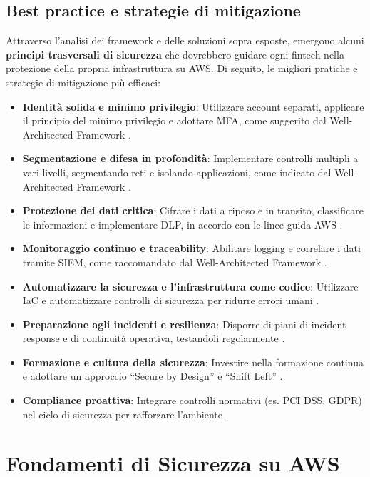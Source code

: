 \documentclass[a4paper,12pt]{report}
\begin{document}
\section{Best practice e strategie di mitigazione}
\label{sec:best_practices}
Attraverso l’analisi dei framework e delle soluzioni sopra esposte, emergono alcuni \textbf{principi trasversali di sicurezza} che dovrebbero guidare ogni fintech nella protezione della propria infrastruttura su AWS. Di seguito, le migliori pratiche e strategie di mitigazione più efficaci:
\begin{itemize}
    \item \textbf{Identità solida e minimo privilegio}: Utilizzare account separati, applicare il principio del minimo privilegio e adottare MFA, come suggerito dal Well-Architected Framework \cite{awsWellArchitected}.
    \item \textbf{Segmentazione e difesa in profondità}: Implementare controlli multipli a vari livelli, segmentando reti e isolando applicazioni, come indicato dal Well-Architected Framework \cite{awsWellArchitected}.
    \item \textbf{Protezione dei dati critica}: Cifrare i dati a riposo e in transito, classificare le informazioni e implementare DLP, in accordo con le linee guida AWS \cite{awsWellArchitected}.
    \item \textbf{Monitoraggio continuo e traceability}: Abilitare logging e correlare i dati tramite SIEM, come raccomandato dal Well-Architected Framework \cite{awsWellArchitected}.
    \item \textbf{Automatizzare la sicurezza e l'infrastruttura come codice}: Utilizzare IaC e automatizzare controlli di sicurezza per ridurre errori umani \cite{awsWellArchitected}.
    \item \textbf{Preparazione agli incidenti e resilienza}: Disporre di piani di incident response e di continuità operativa, testandoli regolarmente \cite{awsWellArchitected}.
    \item \textbf{Formazione e cultura della sicurezza}: Investire nella formazione continua e adottare un approccio “Secure by Design” e “Shift Left” \cite{netguru2023}.
    \item \textbf{Compliance proattiva}: Integrare controlli normativi (es. PCI DSS, GDPR) nel ciclo di sicurezza per rafforzare l'ambiente \cite{netguru2023}.
\end{itemize}


\chapter{Fondamenti di Sicurezza su AWS}
\end{document}
